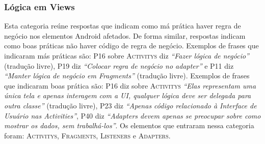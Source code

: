 
\subsubsection{L\'ogica em Views}
Esta categoria re\'une respostas que indicam como m\'a pr\'atica haver regra de neg\'ocio nos elementos Android afetados. De forma similar, respostas indicam como boas pr\'aticas n\~ao haver c\'odigo de regra de neg\'ocio. Exemplos de frases que indicaram m\'as pr\'aticas s\~ao: P16 sobre \textsc{Activitys} diz \textit{``Fazer l\'ogica de neg\'ocio''} (tradu\c{c}\~ao livre), P19 diz \textit{``Colocar regra de neg\'ocio no adapter''} e P11 diz \textit{``Manter l\'ogica de neg\'ocio em Fragments''} (tradu\c{c}\~ao livre). Exemplos de frases que indicaram boas pr\'atica s\~ao: P16 diz sobre \textsc{Activitys} \textit{``Elas representam uma \'unica tela e apenas interagem com a UI, qualquer l\'ogica deve ser delegada para outra classe''} (tradu\c{c}\~ao livre), P23 diz \textit{``Apenas c\'odigo relacionado \`a Interface de Usu\'ario nas Activities''}, P40 diz \textit{``Adapters devem apenas se preocupar sobre como mostrar os dados, sem trabalh\'a-los''}. Os elementos que entraram nessa categoria foram: \textsc{Activitys}, \textsc{Fragments}, \textsc{Listeners} e \textsc{Adapters}. 


